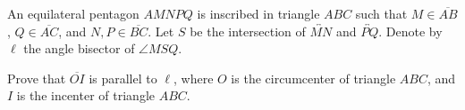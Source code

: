 An equilateral pentagon $AMNPQ$ is inscribed in triangle $ABC$ such that $M\in\overline{AB}$,  $Q\in\overline{AC}$,  and $N,P\in\overline{BC}$. Let $S$ be the intersection of $\overleftrightarrow{MN}$ and $\overleftrightarrow{PQ}$. Denote by $\ell$ the angle bisector of $\angle MSQ$.

Prove that $\overline{OI}$ is parallel to $\ell$,  where $O$ is the circumcenter of triangle $ABC$,  and $I$ is the incenter of triangle $ABC$.